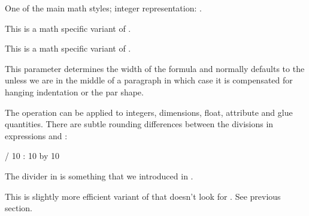 \stopoldprimitive

\startoldprimitive[title={\prm {displaystyle}}]

One of the main math styles; integer representation: \the\displaystyle.

\stopoldprimitive

\startoldprimitive[title={\prm {displaywidowpenalties}}]

This is a math specific variant of .

\stopoldprimitive

\startoldprimitive[title={\prm {displaywidowpenalty}}]

This is a math specific variant of .

\stopoldprimitive

\startoldprimitive[title={\prm {displaywidth}}]

This parameter determines the width of the formula and normally defaults to the
 unless we are in the middle of a paragraph in which case it is
compensated for hanging indentation or the par shape.

\stopoldprimitive

\startoldprimitive[title={\prm {divide}}]

The  operation can be applied to integers, dimensions, float,
attribute and glue quantities. There are subtle rounding differences between
the divisions in expressions and :

\starttabulate
\NC {}
\EQ        {} \the\numexpr\scratchcounter/ 10\relax
\NC \NR
\NC {}
\EQ        {} \the\numexpr\scratchcounter: 10\relax
\NC \NR
\NC {}
\EQ        {} \divide\scratchcounter by 10
                               \the\scratchcounter
\NC \NR
\stoptabulate

The \type {:} divider in  is something that we introduced in
\LUATEX.

\stopoldprimitive

\startnewprimitive[title={\prm {divideby}}]

This is slightly more efficient variant of  that doesn't look for
. See previous section.

\stopnewprimitive

\startoldprimitive[title={\prm {doublehyphendemerits}}]

